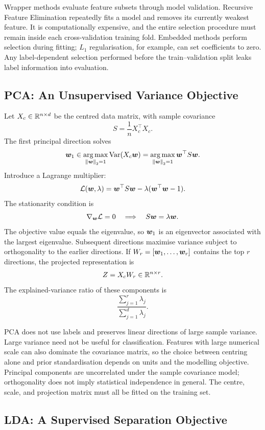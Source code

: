 Wrapper methods evaluate feature subsets through model validation. Recursive Feature Elimination repeatedly fits a model and removes its currently weakest feature. It is computationally expensive, and the entire selection procedure must remain inside each cross-validation training fold. Embedded methods perform selection during fitting; $L_1$ regularisation, for example, can set coefficients to zero. Any label-dependent selection performed before the train--validation split leaks label information into evaluation.

\subsection{PCA: An Unsupervised Variance Objective}

Let $X_c\in\mathbb{R}^{n\times d}$ be the centred data matrix, with sample covariance
\[
  S=\frac1nX_c^{\top}X_c.
\]
The first principal direction solves
\[
  \bm{w}_1
  \in\operatorname*{arg\,max}_{\left\lVert \bm{w}\right\rVert_2=1}
    \operatorname{Var}(X_c\bm{w})
  =\operatorname*{arg\,max}_{\left\lVert \bm{w}\right\rVert_2=1}
    \bm{w}^{\top}S\bm{w}.
\]
Introduce a Lagrange multiplier:
\[
  \mathcal L(\bm{w},\lambda)
  =\bm{w}^{\top}S\bm{w}
   -\lambda(\bm{w}^{\top}\bm{w}-1).
\]
The stationarity condition is
\[
  \nabla_{\bm{w}}\mathcal L=0
  \quad\Longrightarrow\quad
  S\bm{w}=\lambda\bm{w}.
\]
The objective value equals the eigenvalue, so $\bm{w}_1$ is an eigenvector associated with the largest eigenvalue. Subsequent directions maximise variance subject to orthogonality to the earlier directions. If
$W_r=[\bm{w}_1,\ldots,\bm{w}_r]$ contains the top $r$ directions, the projected representation is
\[
  Z=X_cW_r\in\mathbb{R}^{n\times r}.
\]
The explained-variance ratio of these components is
\[
  \frac{\sum_{j=1}^{r}\lambda_j}
       {\sum_{j=1}^{d}\lambda_j}.
\]

PCA does not use labels and preserves linear directions of large sample variance. Large variance need not be useful for classification. Features with large numerical scale can also dominate the covariance matrix, so the choice between centring alone and prior standardisation depends on units and the modelling objective. Principal components are uncorrelated under the sample covariance model; orthogonality does not imply statistical independence in general. The centre, scale, and projection matrix must all be fitted on the training set.

\subsection{LDA: A Supervised Separation Objective}

